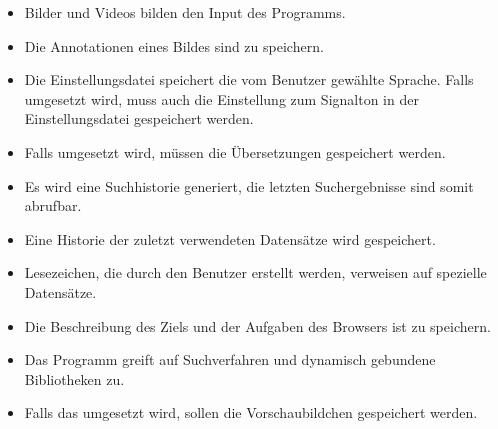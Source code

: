 \begin{itemize}
	\item Bilder und Videos bilden den Input des Programms.
	\item Die Annotationen eines Bildes sind zu speichern.
	\item Die Einstellungsdatei speichert die vom Benutzer gewählte Sprache. Falls  umgesetzt wird, muss auch die Einstellung zum Signalton in der Einstellungsdatei gespeichert werden.
	\item Falls  umgesetzt wird, müssen die Übersetzungen gespeichert werden.
	\item Es wird eine Suchhistorie generiert, die letzten Suchergebnisse sind somit abrufbar. 
	\item Eine Historie der zuletzt verwendeten Datensätze wird gespeichert.
	\item Lesezeichen, die durch den Benutzer erstellt werden, verweisen auf spezielle Datensätze.
	\item Die Beschreibung des Ziels und der Aufgaben des Browsers ist zu speichern.
	\item Das Programm greift auf Suchverfahren und dynamisch gebundene Bibliotheken zu.
	\item Falls das  umgesetzt wird, sollen die Vorschaubildchen gespeichert werden.
\end{itemize}
\pagebreak
